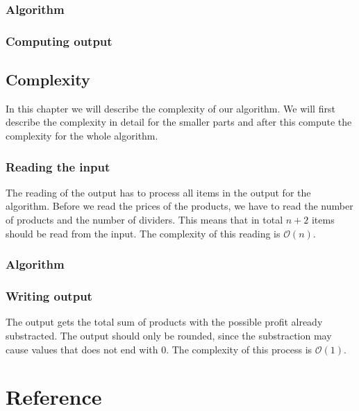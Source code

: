 \documentclass{article}
\newcommand{\bigO}[1]{\mathcal{O}(#1)}
\begin{document}
\subsubsection{Algorithm}

\subsubsection{Computing output}

\subsection{Complexity}
In this chapter we will describe the complexity of our algorithm. We will first describe the complexity in detail for the smaller parts and after this compute the complexity for the whole algorithm.

\subsubsection{Reading the input}
The reading of the output has to process all items in the output for the algorithm. Before we read the prices of the products, we have to read the number of products and the number of dividers. This means that in total $n + 2$ items should be read from the input. The complexity of this reading is $\bigO{n}$.

\subsubsection{Algorithm}

\subsubsection{Writing output}
The output gets the total sum of products with the possible profit already substracted. The output should only be rounded, since the substraction may cause values that does not end with 0. The complexity of this process is $\bigO{1}$.

\newpage
\section{Reference}
\end{document}
